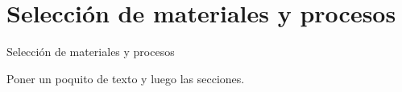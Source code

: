 \section{Selecci\'on de materiales y procesos}
\label{Seleccion_materiales_procesos}

Selecci\'on de materiales y procesos
\par
Poner un poquito de texto y luego las secciones.